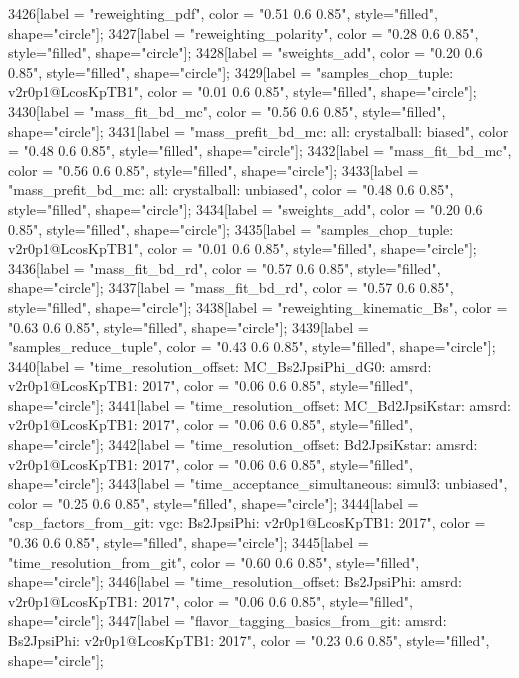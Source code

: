 {	3426[label = "reweighting_pdf", color = "0.51 0.6 0.85", style="filled", shape="circle"];
	3427[label = "reweighting_polarity", color = "0.28 0.6 0.85", style="filled", shape="circle"];
	3428[label = "sweights_add", color = "0.20 0.6 0.85", style="filled", shape="circle"];
	3429[label = "samples_chop_tuple\nversion: v2r0p1@LcosKpTB1", color = "0.01 0.6 0.85", style="filled", shape="circle"];
	3430[label = "mass_fit_bd_mc", color = "0.56 0.6 0.85", style="filled", shape="circle"];
	3431[label = "mass_prefit_bd_mc\nmassbin: all\nmassmodel: crystalball\ntrigger: biased", color = "0.48 0.6 0.85", style="filled", shape="circle"];
	3432[label = "mass_fit_bd_mc", color = "0.56 0.6 0.85", style="filled", shape="circle"];
	3433[label = "mass_prefit_bd_mc\nmassbin: all\nmassmodel: crystalball\ntrigger: unbiased", color = "0.48 0.6 0.85", style="filled", shape="circle"];
	3434[label = "sweights_add", color = "0.20 0.6 0.85", style="filled", shape="circle"];
	3435[label = "samples_chop_tuple\nversion: v2r0p1@LcosKpTB1", color = "0.01 0.6 0.85", style="filled", shape="circle"];
	3436[label = "mass_fit_bd_rd", color = "0.57 0.6 0.85", style="filled", shape="circle"];
	3437[label = "mass_fit_bd_rd", color = "0.57 0.6 0.85", style="filled", shape="circle"];
	3438[label = "reweighting_kinematic_Bs", color = "0.63 0.6 0.85", style="filled", shape="circle"];
	3439[label = "samples_reduce_tuple", color = "0.43 0.6 0.85", style="filled", shape="circle"];
	3440[label = "time_resolution_offset\nmode: MC_Bs2JpsiPhi_dG0\ntimeres: amsrd\nversion: v2r0p1@LcosKpTB1\nyear: 2017", color = "0.06 0.6 0.85", style="filled", shape="circle"];
	3441[label = "time_resolution_offset\nmode: MC_Bd2JpsiKstar\ntimeres: amsrd\nversion: v2r0p1@LcosKpTB1\nyear: 2017", color = "0.06 0.6 0.85", style="filled", shape="circle"];
	3442[label = "time_resolution_offset\nmode: Bd2JpsiKstar\ntimeres: amsrd\nversion: v2r0p1@LcosKpTB1\nyear: 2017", color = "0.06 0.6 0.85", style="filled", shape="circle"];
	3443[label = "time_acceptance_simultaneous\ntimeacc: simul3\ntrigger: unbiased", color = "0.25 0.6 0.85", style="filled", shape="circle"];
	3444[label = "csp_factors_from_git\ncsp: vgc\nmode: Bs2JpsiPhi\nversion: v2r0p1@LcosKpTB1\nyear: 2017", color = "0.36 0.6 0.85", style="filled", shape="circle"];
	3445[label = "time_resolution_from_git", color = "0.60 0.6 0.85", style="filled", shape="circle"];
	3446[label = "time_resolution_offset\nmode: Bs2JpsiPhi\ntimeres: amsrd\nversion: v2r0p1@LcosKpTB1\nyear: 2017", color = "0.06 0.6 0.85", style="filled", shape="circle"];
	3447[label = "flavor_tagging_basics_from_git\nflavor: amsrd\nmode: Bs2JpsiPhi\nversion: v2r0p1@LcosKpTB1\nyear: 2017", color = "0.23 0.6 0.85", style="filled", shape="circle"];
}
